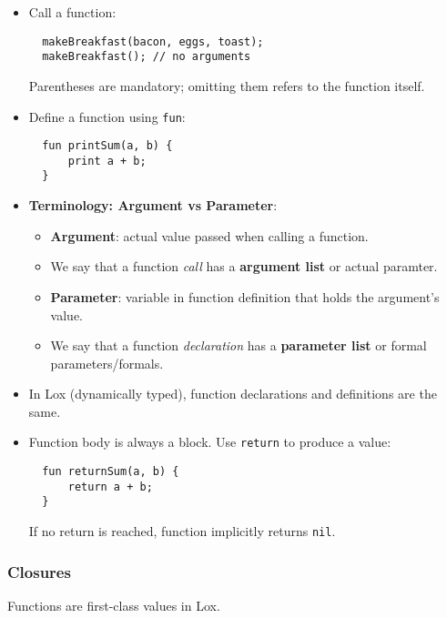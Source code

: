 \documentclass[12pt,a4paper]{article}
\begin{document}
\begin{itemize}
	\item Call a function:
	      \begin{lstlisting}
  makeBreakfast(bacon, eggs, toast);
  makeBreakfast(); // no arguments
  \end{lstlisting}
	      Parentheses are mandatory; omitting them refers to the function itself.

	\item Define a function using \texttt{fun}:
	      \begin{lstlisting}
  fun printSum(a, b) {
      print a + b;
  }
  \end{lstlisting}

	\item \textbf{Terminology: Argument vs Parameter}:
	      \begin{itemize}
		      \item \textbf{Argument}: actual value passed when calling a function.
		      \item We say that a function \textit{call} has a \textbf{argument list} or actual paramter.
		      \item \textbf{Parameter}: variable in function definition that holds the argument’s value.
		      \item We say that a function \textit{declaration} has a \textbf{parameter list} or formal parameters/formals.
	      \end{itemize}

	\item In Lox (dynamically typed), function declarations and definitions are the same.
	\item Function body is always a block. Use \texttt{return} to produce a value:
	      \begin{lstlisting}
  fun returnSum(a, b) {
      return a + b;
  }
  \end{lstlisting}
	      If no return is reached, function implicitly returns \texttt{nil}.
\end{itemize}

\subsubsection{Closures}

Functions are first-class values in Lox.
\end{document}
